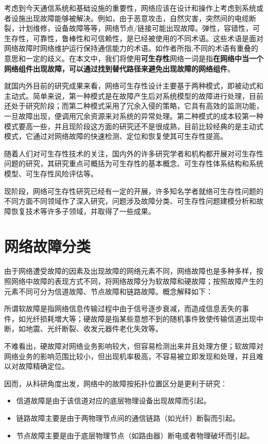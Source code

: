 考虑到今天通信系统和基础设施的重要性，网络应该在设计和操作上考虑到系统或者设施出现故障能够被解决。例如，由于恶意攻击，自然灾害，突然间的电缆断裂，计划维修，设备故障等等，网络节点/链接可能出现故障。弹性，容错性，可生存性，可靠性，鲁棒性和可信赖性，是已经被使用的不同术语。这些术语是面对网络故障时网络维护运行保持通信能力的术语。如作者\cite{al2009comparative}所指,不同的术语有重叠的意思和一定的歧义。在本文中，我们将使用\textbf{可生存性}网络一词是指\textbf{在网络中当一个网络组件出现故障，可以通过找到替代路径来避免出现故障的网络组件}。




就国内外目前的研究成果来看，网络可生存性设计主要基于两种模式\cite{hanjianjun2007}，即被动式和主动式。简单来说，第一种模式是在故障产生后对系统模型的故障进行处理，目前还处于研究阶段；而第二种模式采用了冗余入侵的策略，它具有高效的监测功能，一旦故障出现，便调用冗余资源来对系统的异常处理。第二种模式的成本较第一种模式要高一些，并且现阶段这方面的研究还不是很成熟，目前比较经典的是主动式模式，它通过对网络故障的快速检测、定位和恢复使其可生存性提高。

随着人们对可生存性技术的关注，国内外的许多研究学者和机构都开展对可生存性问题的研究，其研究重点可概括为可生存性的基本概念\cite{kuipers2012overview}、可生存性体系结构和系统模型\cite{luxinhua2006}、可生存性风险评估\cite{linxuegang2006}等。

现阶段，网络可生存性研究已经有一定的开展，许多知名学者就络可生存性问题的不同方面不同领域作了深入研究，问题涉及故障分类、可生存性问题建模分析和故障恢复技术等许多子领域，并取得了一些成果。

\section{网络故障分类}
由于网络遭受故障的因素及出现故障的网络元素不同，网络故障也是多种多样，按照网络中故障的表现方式不同，将网络故障分为软故障和硬故障；按照故障产生的元素不同可分为信道故障、节点故障和链路故障。概念解释如下：

所谓软故障是指网络信息传输过程中由于信号逐步衰减，而造成信息丢失的事 件，如光纤损耗増大等；硬故障是指某些意想不到的随机事件致使传输信道出现中断，如地震、光纤断裂、收发元器件老化失效等。

不难看出，硬故障对网络业务影响较大，但容易检测出来并且处理方便；软故障对网络业务的影响范围比较小，但出现机率极高，不容易被立即发现和处理，并且难以对故障精确定位。

因而，从科研角度出发，网络中的故障按拓扑位置区分是更利于研究：
\begin{itemize}
\item 信道故障是由于该信道对应的底层物理设备出现故障而引起。
\item 链路故障主要是由于两物理节点间的通信链路（如光纤）断裂而引起。
\item 节点故障主要是由于底层物理节点（如路由器）断电或者物理破坏而引起。
\end{itemize}



